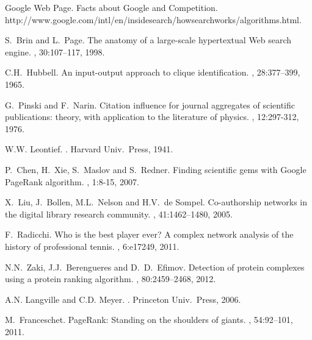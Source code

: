 \documentclass[11pt,draftcls,onecolumn]{IEEEtran}
\begin{document}
\newpage

\begin{thebibliography}{1}

Google Web Page. 
\newblock Facts about Google and Competition.
\newblock http://www.google.com/intl/en/insidesearch/howsearchworks/algorithms.html.



S.~Brin and L.~Page.
\newblock The anatomy of a large-scale hypertextual {Web} search engine.
, 30:107--117, 1998.


C.{\;}H.\ Hubbell.
\newblock An input-output approach to clique identification.
, 28:377--399, 1965.

G.~Pinski and F.~Narin.
\newblock Citation influence for journal aggregates of scientific
publications: theory, with application to the literature of physics.
, 12:297-312, 1976.

W.{\;}W. Leontief.
.
\newblock Harvard Univ.\ Press, 1941.

P.~Chen, H.~Xie, S.~Maslov and S.~Redner. 
\newblock Finding scientific gems with Google PageRank algorithm.
, 1:8-15, 2007.

X.~Liu, J.~Bollen, M.\;L.~Nelson and H.\;V.~de Sompel.
\newblock Co-authorship
networks in the digital library research community. 
, 41:1462--1480, 2005.

F.~Radicchi.
\newblock Who is the best player ever? A complex network analysis of the history of professional tennis.
, 6:e17249, 2011.

N.{\;}N.~Zaki, J.{\;}J.~Berengueres and D.~{\;}D.~Efimov.
\newblock Detection of protein complexes using a protein ranking algorithm.
, 80:2459--2468, 2012.

A.{\;}N. Langville and C.{\;}D. Meyer.
.
\newblock Princeton Univ.\ Press, 2006.


M.~Franceschet.
\newblock Page{R}ank: Standing on the shoulders of giants.
, 54:92--101, 2011.


\end{thebibliography}
\end{document}
